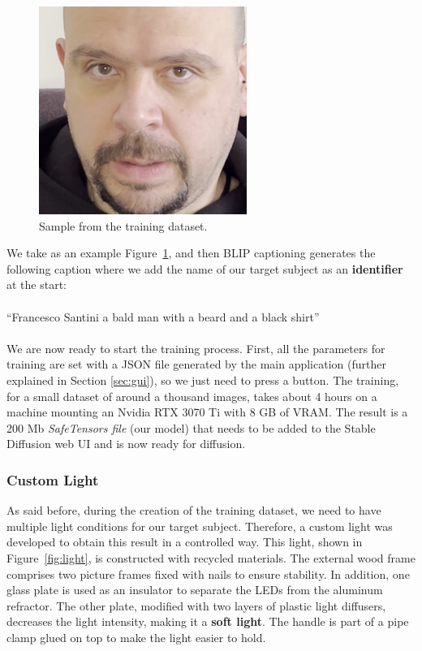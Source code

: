 \documentclass[preprint]{elsarticle}
\begin{document}
\begin{figure}[H]
	\centering
	\includegraphics[scale=0.3, keepaspectratio]{img/project_img/santini-training.png}
	\caption{Sample from the training dataset.}
	\label{fig:santini-training}
\end{figure}


We take as an example Figure~\ref{fig:santini-training}, 
and then BLIP captioning generates the following caption 
where we add the name of our target subject as an \textbf{identifier} at the start:\\\\
``Francesco Santini a bald man with a beard and a black shirt''\\\\
We are now ready to start the training process. 
First, all the parameters for training are set with a JSON file generated by the main application 
(further explained in Section \ref{sec:gui}), 
so we just need to press a button. 
The training, for a small dataset of around a thousand images, 
takes about 4 hours on a machine mounting an Nvidia RTX 3070 Ti with 8 GB of VRAM. 
The result is a 200 Mb \emph{SafeTensors file} (our model) 
that needs to be added to the Stable Diffusion web UI and is now ready for diffusion.

\subsubsection{Custom Light}


As said before, during the creation of the training dataset, we need to have multiple 
light conditions for our target subject. 
Therefore, a custom light was developed to obtain this result in a controlled way.
This light, shown in Figure~\ref{fig:light}, is constructed with recycled materials.
The external wood frame comprises two picture frames fixed with nails to ensure stability. 
In addition, one glass plate is used as an insulator to separate the LEDs from the aluminum refractor.
The other plate, modified with two layers of plastic light diffusers, 
decreases the light intensity, making it a \textbf{soft light}.
The handle is part of a pipe clamp glued on top to make the light easier to hold.
\end{document}
